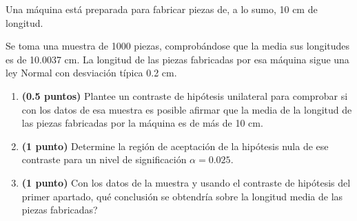 
Una máquina está preparada para fabricar piezas de, a lo sumo, 10 cm de longitud.

Se toma una muestra de 1000 piezas, comprobándose que la media sus longitudes es de 10.0037 cm. La longitud de las piezas fabricadas por esa máquina sigue una ley Normal con desviación típica 0.2 cm.
\begin{enumerate}[label=\alph*)]
\item \textbf{(0.5 puntos)} Plantee un contraste de hipótesis unilateral para comprobar si con los datos de esa muestra es posible afirmar que la media de la longitud de las piezas fabricadas por la máquina es de más de 10 cm.
\item \textbf{(1 punto)} Determine la región de aceptación de la hipótesis nula de ese contraste para un nivel de significación $\alpha=0.025$.
\item \textbf{(1 punto)} Con los datos de la muestra y usando el contraste de hipótesis del primer apartado, \textquestiondown{}qué conclusión se obtendría sobre la longitud media de las piezas fabricadas?
\end{enumerate}

